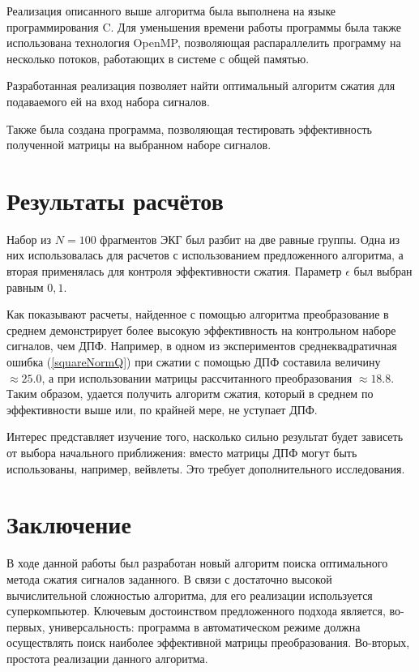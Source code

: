 \documentclass[11pt, oneside, a4paper]{article}
\begin{document}
Реализация описанного выше алгоритма была выполнена на языке программирования C. Для уменьшения времени работы программы была также использована технология OpenMP, позволяющая распараллелить программу на несколько потоков, работающих в системе с общей памятью. 

Разработанная реализация позволяет найти оптимальный алгоритм сжатия для подаваемого ей на вход набора сигналов. 

Также была создана программа, позволяющая тестировать эффективность полученной матрицы на выбранном наборе сигналов. 

\section{Результаты расчётов}

Набор из $N = 100$ фрагментов ЭКГ был разбит на две равные группы. Одна из них использовалась для расчетов с использованием предложенного алгоритма, а вторая применялась для контроля эффективности сжатия. Параметр $\epsilon$ был выбран равным $0,1$.

Как показывают расчеты, найденное с помощью алгоритма преобразование в среднем демонстрирует более высокую эффективность на контрольном наборе сигналов, чем ДПФ. Например, в одном из экспериментов среднеквадратичная ошибка (\ref{squareNormQ}) при сжатии с помощью ДПФ составила величину $\approx25.0$, а  при использовании матрицы рассчитанного преобразования $\approx18.8$. Таким образом, удается получить алгоритм сжатия, который в среднем по эффективности выше или, по крайней мере, не уступает ДПФ.

Интерес представляет изучение того, насколько сильно результат будет зависеть от выбора начального приближения: вместо матрицы ДПФ могут быть использованы, например, вейвлеты. Это требует дополнительного исследования. 


\section{Заключение}

В ходе данной работы был разработан новый алгоритм поиска оптимального метода сжатия сигналов заданного. В связи с достаточно высокой вычислительной сложностью алгоритма, для его реализации используется суперкомпьютер. Ключевым достоинством предложенного подхода является, во-первых, универсальность: программа в автоматическом режиме должна осуществлять поиск наиболее эффективной матрицы преобразования. Во-вторых, простота реализации данного алгоритма.
\end{document}
